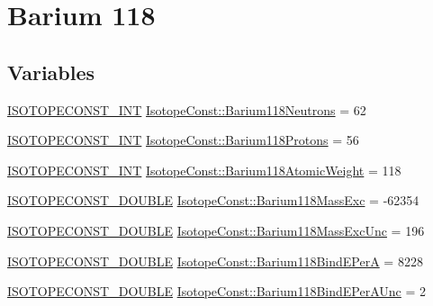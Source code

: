 \hypertarget{group___isotope_const-_barium-_ba118}{}\section{Barium 118}
\label{group___isotope_const-_barium-_ba118}
\subsection*{Variables}
\begin{DoxyCompactItemize}
\item 
\mbox{\hyperlink{group___isotope_const-_macros_ga5f18360b3e99483a35c32d789e62621c}{I\+S\+O\+T\+O\+P\+E\+C\+O\+N\+S\+T\+\_\+\+I\+NT}} \mbox{\hyperlink{group___isotope_const-_barium-_ba118_ga893c49f09b2f9ea5fc36ed5687a88718}{Isotope\+Const\+::\+Barium118\+Neutrons}} = 62
\item 
\mbox{\hyperlink{group___isotope_const-_macros_ga5f18360b3e99483a35c32d789e62621c}{I\+S\+O\+T\+O\+P\+E\+C\+O\+N\+S\+T\+\_\+\+I\+NT}} \mbox{\hyperlink{group___isotope_const-_barium-_ba118_ga3381809fe288d6da8708ab258d949169}{Isotope\+Const\+::\+Barium118\+Protons}} = 56
\item 
\mbox{\hyperlink{group___isotope_const-_macros_ga5f18360b3e99483a35c32d789e62621c}{I\+S\+O\+T\+O\+P\+E\+C\+O\+N\+S\+T\+\_\+\+I\+NT}} \mbox{\hyperlink{group___isotope_const-_barium-_ba118_ga9868868b59a341d7022db761ebe0ef52}{Isotope\+Const\+::\+Barium118\+Atomic\+Weight}} = 118
\item 
\mbox{\hyperlink{group___isotope_const-_macros_ga8f45a7272ce02c0b4c65c44636ed719a}{I\+S\+O\+T\+O\+P\+E\+C\+O\+N\+S\+T\+\_\+\+D\+O\+U\+B\+LE}} \mbox{\hyperlink{group___isotope_const-_barium-_ba118_ga6f44f3f697f4593af40c4b4f8ccb49ec}{Isotope\+Const\+::\+Barium118\+Mass\+Exc}} = -\/62354
\item 
\mbox{\hyperlink{group___isotope_const-_macros_ga8f45a7272ce02c0b4c65c44636ed719a}{I\+S\+O\+T\+O\+P\+E\+C\+O\+N\+S\+T\+\_\+\+D\+O\+U\+B\+LE}} \mbox{\hyperlink{group___isotope_const-_barium-_ba118_ga584c8bae53923d19de59649e1f77e660}{Isotope\+Const\+::\+Barium118\+Mass\+Exc\+Unc}} = 196
\item 
\mbox{\hyperlink{group___isotope_const-_macros_ga8f45a7272ce02c0b4c65c44636ed719a}{I\+S\+O\+T\+O\+P\+E\+C\+O\+N\+S\+T\+\_\+\+D\+O\+U\+B\+LE}} \mbox{\hyperlink{group___isotope_const-_barium-_ba118_ga6bb9950a9636d900f15ac2b873fabd8e}{Isotope\+Const\+::\+Barium118\+Bind\+E\+PerA}} = 8228
\item 
\mbox{\hyperlink{group___isotope_const-_macros_ga8f45a7272ce02c0b4c65c44636ed719a}{I\+S\+O\+T\+O\+P\+E\+C\+O\+N\+S\+T\+\_\+\+D\+O\+U\+B\+LE}} \mbox{\hyperlink{group___isotope_const-_barium-_ba118_gaa88a0e47f3e44036ba253fa323f50c00}{Isotope\+Const\+::\+Barium118\+Bind\+E\+Per\+A\+Unc}} = 2

\end{DoxyCompactItemize}
